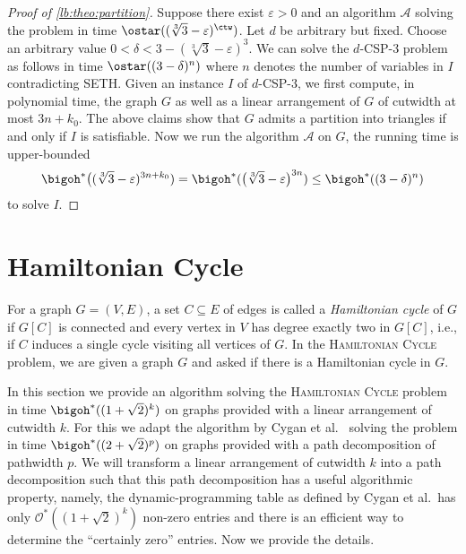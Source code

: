 \documentclass[a4paper,UKenglish,cleveref, autoref, thm-restate]{lipics-v2021}
\begin{document}
\begin{proof}[Proof of \cref{lb:theo:partition}]
    Suppose there exist $\varepsilon > 0$ and an algorithm $\mathcal{A}$ solving the \Tpartp problem in time $\ostar((\sqrt[3]{3}-\varepsilon)^{\ctw})$.
    Let $d$ be arbitrary but fixed.
    Choose an arbitrary value $0 < \delta < 3 - (\sqrt[3]{3} - \varepsilon)^3$.
    We can solve the $d$-CSP-3 problem as follows in time $\ostar((3-\delta)^n)$ where $n$ denotes the number of variables in $I$ contradicting SETH.
    Given an instance $I$ of $d$-CSP-$3$, 
    we first compute, in polynomial time, the graph $G$ as well as a linear arrangement of $G$ of cutwidth at most $3n+k_0$.
    The above claims show that $G$ admits a partition into triangles if and only if $I$ is satisfiable.
    Now we run the algorithm $\mathcal{A}$ on $G$, the running time is upper-bounded 
    \[\bigoh^*\big((\sqrt[3]{3}-\varepsilon)^{3n+k_0}) = \bigoh^*(\big(\sqrt[3]{3} - \varepsilon \big)^{3n}) \leq \bigoh^*((3-\delta)^n)
    \]
    to solve $I$.
\end{proof}


\section{Hamiltonian Cycle}\label{sec:hc-ub}


For a graph $G=(V,E)$, a set $C \subseteq E$ of edges is called a \emph{Hamiltonian cycle} of $G$ if $G[C]$ is connected and every vertex in $V$ has degree exactly two in $G[C]$, i.e., if $C$ induces a single cycle visiting all vertices of $G$.
In the \textsc{Hamiltonian Cycle} problem, we are given a graph $G$ and asked if there is a Hamiltonian cycle in $G$.

In this section we provide an algorithm solving the \textsc{Hamiltonian Cycle} problem in time $\bigoh^*((1 + \sqrt 2)^k)$ on graphs provided with a linear arrangement of cutwidth $k$.
For this we adapt the algorithm by Cygan et al.~\cite{DBLP:journals/jacm/CyganKN18} solving the problem in time $\bigoh^*((2 + \sqrt 2)^p)$
on graphs provided with a path decomposition of pathwidth $p$.
We will transform a linear arrangement of cutwidth $k$ into a path decomposition such that this path decomposition has a useful algorithmic property, namely, the dynamic-programming table as defined by Cygan et al.\ has only $\mathcal{O}^*((1 + \sqrt 2)^k)$ non-zero entries and there is an efficient way to determine the ``certainly zero'' entries. 
Now we provide 
the 
details.
\end{document}
